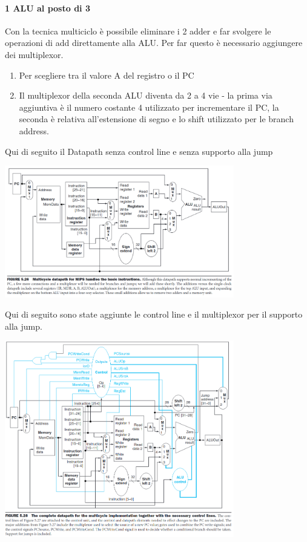 \documentclass[12pt, a4paper, openany]{book}
\begin{document}
\paragraph*{1 ALU al posto di 3} Con la tecnica multiciclo è possibile eliminare i 2 adder
e far svolgere le operazioni di add direttamente alla ALU. Per far questo è necessario aggiungere
dei multiplexor.
\begin{enumerate}
    \item Per scegliere tra il valore A del registro o il PC
    \item Il multiplexor della seconda ALU diventa da 2 a 4 vie - la prima via aggiuntiva
    è il numero costante 4 utilizzato per incrementare il PC, la seconda è relativa all'estensione
    di segno e lo shift utilizzato per le branch address.
\end{enumerate}
Qui di seguito il Datapath senza control line e senza supporto alla jump
\begin{center}
    \includegraphics[width=100mm, scale=0.5]{Multicycle Datapath.png}
\end{center}
Qui di seguito sono state aggiunte le control line e il  multiplexor per il supporto alla
jump.
\begin{center}
    \includegraphics[width=100mm, scale=0.5]{Datapath final.png}
\end{center}
\end{document}
